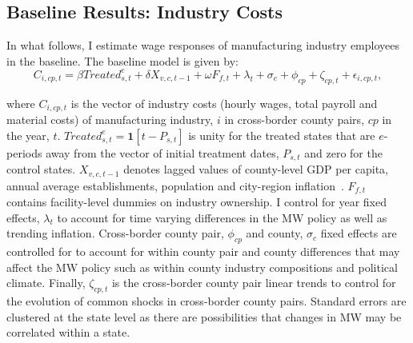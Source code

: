 \documentclass[12pt, english]{article}
\begin{document}
    \subsection{Baseline Results: Industry Costs}\label{subsec:baseline-results-industry-costs}
    In what follows, I estimate wage responses of manufacturing industry employees in the baseline. The baseline model is given by:
    \begin{equation}
        C_{i,cp,t} = \beta Treated_{s,t}^e + \delta X_{v,c,t-1} + \omega F_{f,t} + \lambda_{t} + \sigma_{c} + \phi_{cp} + \zeta_{cp,t} + \epsilon_{i,cp,t},\label{eq:baseline-wages}
    \end{equation}
    

    where $C_{i,cp,t}$ is the vector of industry costs (hourly wages, total payroll and material costs) of manufacturing industry, $i$ in cross-border county pairs, $cp$ in the year, $t$. $Treated_{s,t}^e = \textbf{1}[t - P_{s,t}]$ is unity for the treated states that are $e$-periods away from the vector of initial treatment dates, $P_{s,t}$ and zero for the control states. $X_{v,c,t-1}$ denotes lagged values of county-level GDP per capita, annual average establishments, population and city-region inflation~\parencite{gopalan2021state, dube2010minimum, clemens2019making}. $F_{f,t}$ contains facility-level dummies on industry ownership. I control for year fixed effects, $\lambda_{t}$ to account for time varying differences in the MW policy as well as trending inflation. Cross-border county pair, $\phi_{cp}$ and county, $\sigma_{c}$ fixed effects are controlled for to account for within county pair and county differences that may affect the MW policy such as within county industry compositions and political climate. Finally, $\zeta_{cp,t}$ is the cross-border county pair linear trends to control for the evolution of common shocks in cross-border county pairs. Standard errors are clustered at the state level as there are possibilities that changes in MW may be correlated within a state.
\end{document}
